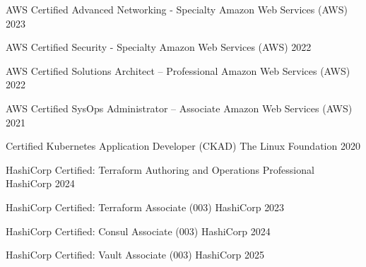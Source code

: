 

\begin{cvhonors}

  \cvhonor
    {AWS Certified Advanced Networking - Specialty} %
    {Amazon Web Services (AWS)} %
    {} %
    {2023} %

  \cvhonor
    {AWS Certified Security - Specialty} %
    {Amazon Web Services (AWS)} %
    {} %
    {2022} %

  \cvhonor
    {AWS Certified Solutions Architect – Professional} %
    {Amazon Web Services (AWS)} %
    {} %
    {2022} %

  \cvhonor
    {AWS Certified SysOps Administrator – Associate} %
    {Amazon Web Services (AWS)} %
    {} %
    {2021} %

  \cvhonor
    {Certified Kubernetes Application Developer (CKAD)} %
    {The Linux Foundation} %
    {} %
    {2020} %

  \cvhonor
    {HashiCorp Certified: Terraform Authoring and Operations Professional} %
    {HashiCorp} %
    {} %
    {2024} %

  \cvhonor
    {HashiCorp Certified: Terraform Associate (003)} %
    {HashiCorp} %
    {} %
    {2023} %

  \cvhonor
    {HashiCorp Certified: Consul Associate (003)} %
    {HashiCorp} %
    {} %
    {2024} %

  \cvhonor
    {HashiCorp Certified: Vault Associate (003)} %
    {HashiCorp} %
    {} %
    {2025} %

\end{cvhonors}